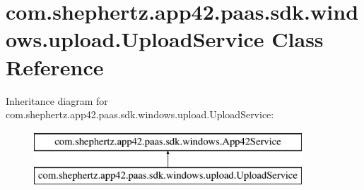 \hypertarget{classcom_1_1shephertz_1_1app42_1_1paas_1_1sdk_1_1windows_1_1upload_1_1_upload_service}{\section{com.\+shephertz.\+app42.\+paas.\+sdk.\+windows.\+upload.\+Upload\+Service Class Reference}
\label{classcom_1_1shephertz_1_1app42_1_1paas_1_1sdk_1_1windows_1_1upload_1_1_upload_service}
}
Inheritance diagram for com.\+shephertz.\+app42.\+paas.\+sdk.\+windows.\+upload.\+Upload\+Service\+:\begin{figure}[H]
\begin{center}
\leavevmode
\includegraphics[height=2.000000cm]{classcom_1_1shephertz_1_1app42_1_1paas_1_1sdk_1_1windows_1_1upload_1_1_upload_service}
\end{center}
\end{figure}

